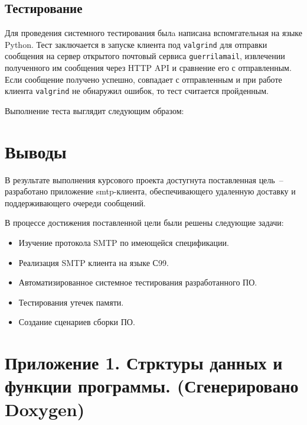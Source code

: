 \documentclass[a4paper,12pt]{report}
\begin{document}
\section{Тестирование}

Для проведения системного тестирования былa написана вспомгательная на языке
Python. Тест заключается в запуске клиента под \texttt{valgrind} для отправки
сообщения на сервер открытого почтовый сервиса \texttt{guerrilamail},
извлечении полученного им сообщения через HTTP API и сравнение его с
отправленным. Если сообщение получено успешно, совпадает с отправленным и при
работе клиента \texttt{valgrind} не обнаружил ошибок, то тест считается
пройденным.

Выполнение теста выглядит следующим образом:
\begingroup
\fontsize{10pt}{12pt}
\selectfont

\endgroup

\cleardoublepage
{}
{}
\chapter*{Выводы}

В результате выполнения курсового проекта достугнута поставленная цель~--
разработано приложение smtp-клиента, обеспечивающего удаленную доставку и
поддерживающего очереди сообщений.

В процессе достижения поставленной цели были решены следующие задачи: 
\begin{itemize}
\item Изучение протокола SMTP по имеющейся спецификации.
\item Реализация SMTP клиента на языке С99.
\item Автоматизированное системное тестирования разработанного ПО. 
\item Тестирования утечек памяти.
\item Создание сценариев сборки ПО.
\end{itemize}

\cleardoublepage
{}
{}
\chapter*{Приложение 1. Стрктуры данных и функции программы. (Сгенерировано
    Doxygen)}


\end{document}
